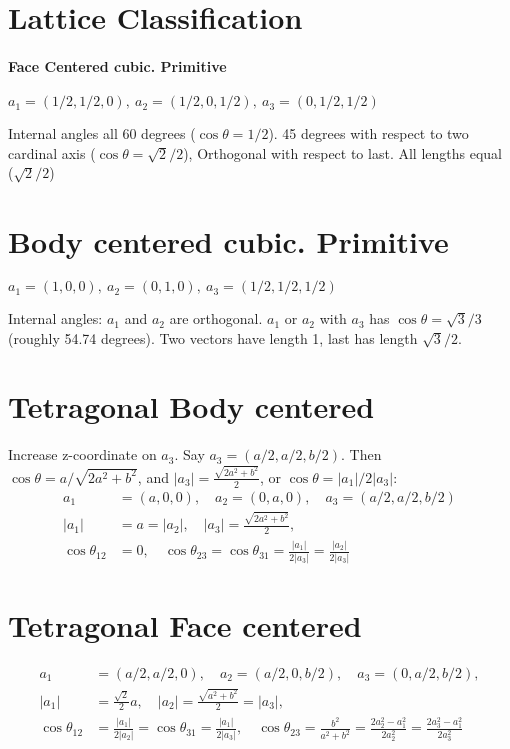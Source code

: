 \documentclass[main.tex]{subfiles}
\begin{document}
	\section{Lattice Classification}
	\paragraph{Face Centered cubic. Primitive}
	$a_1 = (1/2, 1/2, 0),\ a_2 = (1/2, 0, 1/2),\ a_3 = (0, 1/2, 1/2)$
	
	Internal angles all 60 degrees ($\cos \theta = 1/2$). 45 degrees with respect to two cardinal axis ($\cos \theta = \sqrt{2}/2$), Orthogonal with respect to last. All lengths equal ($\sqrt{2}/2$)
	
	\section{Body centered cubic. Primitive}
	$ a_1 = (1,0,0),\ a_2 = (0,1,0),\ a_3 = (1/2,1/2,1/2) $
	
	Internal angles: $a_1$ and $a_2$ are orthogonal. $a_1$ or $a_2$ with $a_3$ has $\cos \theta = \sqrt{3}/3 $ (roughly 54.74 degrees). Two vectors have length 1, last has length $\sqrt{3}/2$.
	
	\section{Tetragonal Body centered}
	Increase z-coordinate on $a_3$. Say $a_3 = (a/2,a/2,b/2) $. Then $\cos \theta = a/\sqrt{2a^2+b^2} $, and $|a_3| = \frac{\sqrt{2a^2+b^2}}{2}$, or $ \cos \theta = |a_1|/2|a_3|$:
	\begin{align}
		a_1 &= (a,0,0), \quad a_2 = (0,a,0), \quad a_3 = (a/2,a/2,b/2) \\
		|a_1| &= a = |a_2|, \quad |a_3| = \frac{\sqrt{2a^2+b^2}}{2}, \\
		\cos \theta_{12} &= 0, \quad \cos \theta_{23} = \cos \theta_{31} = \frac{|a_1|}{2|a_3|}  = \frac{|a_2|}{2 |a_3|}
	\end{align}
	
	\section{Tetragonal Face centered}
	\begin{align}
		a_1 &= (a/2,a/2,0), \quad a_2 = (a/2,0,b/2), \quad a_3 = (0,a/2,b/2),\\
		|a_1| &= \frac{\sqrt{2}}{2} a, \quad |a_2| = \frac{\sqrt{a^2+b^2}}{2} = |a_3|, \\
		\cos \theta_{12} & = \frac{|a_1|}{2|a_2|} = \cos \theta_{31} = \frac{|a_1|}{2 |a_3|}, \quad \cos \theta_{23} = \frac{b^2}{a^2+b^2} = \frac{2a_2^2 - a_1^2}{2a_2^2} = \frac{2a_3^2 - a_1^2}{2a_3^2}
	\end{align}
\end{document}
